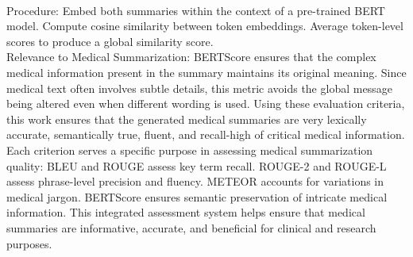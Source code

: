 \begin{enumerate}
\\
Procedure:
Embed both summaries within the context of a pre-trained BERT model.
Compute cosine similarity between token embeddings.
Average token-level scores to produce a global similarity score.
\\
Relevance to Medical Summarization: BERTScore ensures that the complex medical information present in the summary maintains its original meaning. Since medical text often involves subtle details, this metric avoids the global message being altered even when different wording is used.
Using these evaluation criteria, this work ensures that the generated medical summaries are very lexically accurate, semantically true, fluent, and recall-high of critical medical information. Each criterion serves a specific purpose in assessing medical summarization quality:
BLEU and ROUGE assess key term recall.
ROUGE-2 and ROUGE-L assess phrase-level precision and fluency.
METEOR accounts for variations in medical jargon.
BERTScore ensures semantic preservation of intricate medical information.
This integrated assessment system helps ensure that medical summaries are informative, accurate, and beneficial for clinical and research purposes.
\end{enumerate}